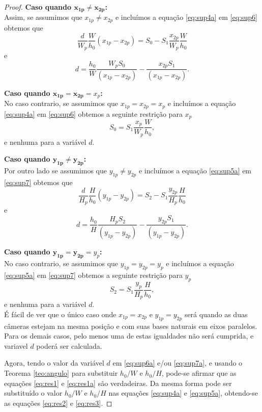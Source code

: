 \documentclass[a4paper,10pt]{article}
\begin{document}
\begin{proof}
\textbf{Caso quando $\mathbf{x_{1p}\neq x_{2p}}$:}\\
Assim, se assumimos que $x_{1p}\neq x_{2p}$ e incluímos a equação \eqref{eq:sup4a} em \eqref{eq:sup6} obtemos que
\begin{equation}\label{eq:sup6b}
 \frac{d}{W_p}\frac{W}{h_0} (x_{1p}-x_{2p})=  S_0- S_1 \frac{x_{2p}}{W_p}\frac{W}{h_0}
\end{equation}
e 
\begin{equation}\label{eq:sup6a}
 d=\frac{h_0}{W} \frac{W_p S_0}{(x_{1p}-x_{2p})}-\frac{x_{2p} S_1}{(x_{1p}-x_{2p})}.
\end{equation}

\textbf{Caso quando $\mathbf{x_{1p}= x_{2p}}=x_{p}$:}\\
No caso contrario, se assumimos que $x_{1p}= x_{2p}=x_p$ e incluímos a equação \eqref{eq:sup4a} 
em \eqref{eq:sup6} obtemos a seguinte restrição para $x_p$
\begin{equation}\label{eq:sup6c}
 S_0 = S_1 \frac{x_{p}}{W_p}\frac{W}{h_0},
\end{equation}
e nenhuma para a variável $d$.

\textbf{Caso quando $\mathbf{y_{1p}\neq y_{2p}}$:}\\
Por outro lado se assumimos que $y_{1p}\neq y_{2p}$ e incluímos  a equação \eqref{eq:sup5a} em \eqref{eq:sup7} obtemos que
\begin{equation}\label{eq:sup7b}
 \frac{d}{H_p}\frac{H}{h_0} (y_{1p}-y_{2p})=  S_2- S_1 \frac{y_{2p}}{H_p}\frac{H}{h_0}
\end{equation}
e 
\begin{equation}\label{eq:sup7a}
 d=\frac{h_0}{H} \frac{H_p S_2}{(y_{1p}-y_{2p})}-\frac{y_{2p} S_1}{(y_{1p}-y_{2p})}.
\end{equation}

\textbf{Caso quando $\mathbf{y_{1p}= y_{2p}}=y_{p}$:}\\
No caso contrario, se assumimos que $y_{1p}= y_{2p}=y_p$ e incluímos a equação \eqref{eq:sup5a} 
em \eqref{eq:sup7} obtemos a seguinte restrição para $y_p$
\begin{equation}\label{eq:sup7c}
 S_2 = S_1 \frac{y_{p}}{H_p}\frac{H}{h_0},
\end{equation}
e nenhuma para a variável $d$.\\

É fácil de ver que o único caso onde $x_{1p}= x_{2p}$ e $y_{1p}= y_{2p}$ será quando
as duas câmeras estejam na mesma posição e com suas bases naturais em eixos paralelos.
Para os demais casos, pelo menos uma de estas igualdades não será cumprida, e variavel
$d$ poderá ser calculada.

Agora, tendo o valor da variável $d$ em \eqref{eq:sup6a} e/ou \eqref{eq:sup7a}, 
e usando o Teorema \ref{teo:angulo}
para substituir ${h_0}/{W}$ e ${h_0}/{H}$, pode-se afirmar que as
equações \eqref{eq:res1} e \eqref{eq:res1a} são verdadeiras. 
Da mesma forma pode ser substituído o valor  ${h_0}/{W}$ e ${h_0}/{H}$ nas
equações \eqref{eq:sup4a} e \eqref{eq:sup5a}, obtendo-se as equações
\eqref{eq:res2} e \eqref{eq:res3}.
\end{proof}
\end{document}
